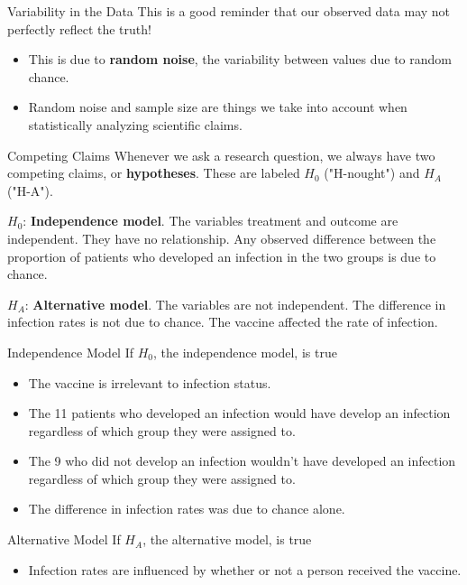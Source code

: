 \begin{frame}{Variability in the Data}
    This is a good reminder that our observed data may not perfectly reflect the truth!
    \begin{itemize}
        \item This is due to \textbf{random noise}, the variability between values due to random chance.
        \item Random noise and sample size are things we take into account when statistically analyzing scientific claims.
    \end{itemize}
\end{frame}

\begin{frame}{Competing Claims}
    Whenever we ask a research question, we always have two competing claims, or \textbf{hypotheses}. These are labeled $H_0$ ("H-nought") and $H_A$ ("H-A").
    
    \vspace{12pt}$H_0$: \textbf{Independence model}. The variables treatment and outcome are independent. They have no relationship. Any observed difference between the proportion of patients who developed an infection in the two groups is due to chance.
    
    \vspace{12pt}$H_A$: \textbf{Alternative model}. The variables are not independent. The difference in infection rates is not due to chance. The vaccine affected the rate of infection.
\end{frame}

\begin{frame}{Independence Model}
    If $H_0$, the independence model, is true
    \begin{itemize}
        \item The vaccine is irrelevant to infection status.
        \item The 11 patients who developed an infection would have develop an infection regardless of which group they were assigned to.
        \item The 9 who did not develop an infection wouldn't have developed an infection regardless of which group they were assigned to.
        \item The difference in infection rates was due to chance alone.
    \end{itemize}
\end{frame}

\begin{frame}{Alternative Model}
    If $H_A$, the alternative model, is true
    \begin{itemize}
        \item Infection rates are influenced by whether or not a person received the vaccine.
    \end{itemize}
\end{frame}

